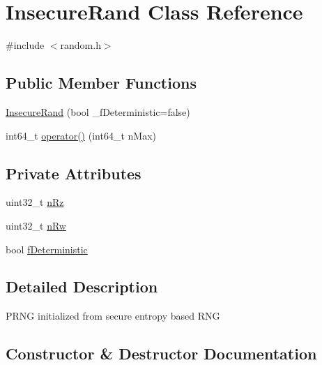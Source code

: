 \hypertarget{class_insecure_rand}{}\section{Insecure\+Rand Class Reference}
\label{class_insecure_rand}


{\ttfamily \#include $<$random.\+h$>$}

\subsection*{Public Member Functions}
\begin{DoxyCompactItemize}
\item 
\mbox{\hyperlink{class_insecure_rand_a1554ac55ef2ad9b78925411a135589ff}{Insecure\+Rand}} (bool \+\_\+f\+Deterministic=false)
\item 
int64\+\_\+t \mbox{\hyperlink{class_insecure_rand_a7d48179092a3acc9e912ad6b53dbd294}{operator()}} (int64\+\_\+t n\+Max)
\end{DoxyCompactItemize}
\subsection*{Private Attributes}
\begin{DoxyCompactItemize}
\item 
uint32\+\_\+t \mbox{\hyperlink{class_insecure_rand_a576e38fb46fbdebc9d6daeb546c36113}{n\+Rz}}
\item 
uint32\+\_\+t \mbox{\hyperlink{class_insecure_rand_a0baa5d4f04bcb55d1595bf79d8c24462}{n\+Rw}}
\item 
bool \mbox{\hyperlink{class_insecure_rand_ae9bed2d175ff061e26e5596e30305011}{f\+Deterministic}}
\end{DoxyCompactItemize}


\subsection{Detailed Description}
P\+R\+NG initialized from secure entropy based R\+NG 

\subsection{Constructor \& Destructor Documentation}
\mbox{\label{class_insecure_rand_a1554ac55ef2ad9b78925411a135589ff}} 
